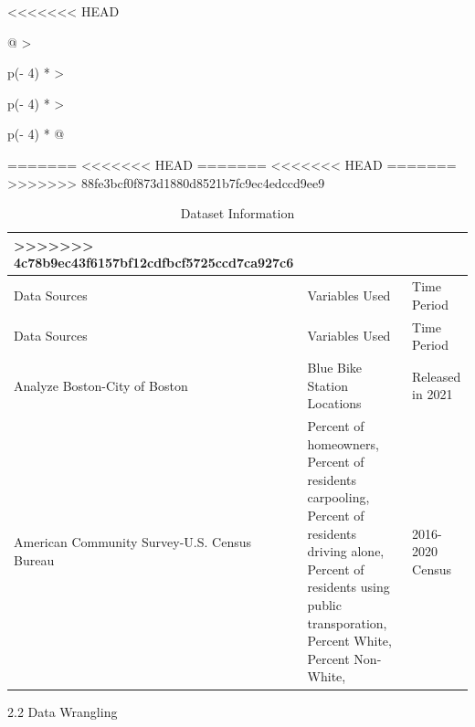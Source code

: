 \documentclass[
  12pt,
]{article}
\begin{document}
<<<<<<< HEAD
\begin{longtable}[]{@{}
  >{\raggedright\arraybackslash}p{(\columnwidth - 4\tabcolsep) * }
  >{\raggedright\arraybackslash}p{(\columnwidth - 4\tabcolsep) * }
  >{\raggedright\arraybackslash}p{(\columnwidth - 4\tabcolsep) * }@{}}
=======
<<<<<<< HEAD
=======
<<<<<<< HEAD
=======
>>>>>>> 88fe3bcf0f873d1880d8521b7fc9ec4edccd9ee9
\begin{longtable}[]{@{}lll@{}}
>>>>>>> 4c78b9ec43f6157bf12cdfbcf5725ccd7ca927c6
\caption{Dataset Information}\tabularnewline
\toprule
\begin{minipage}[b]{\linewidth}\raggedright
Data Sources
\end{minipage} & \begin{minipage}[b]{\linewidth}\raggedright
Variables Used
\end{minipage} & \begin{minipage}[b]{\linewidth}\raggedright
Time Period
\end{minipage} \\
\midrule
\endfirsthead
\toprule
\begin{minipage}[b]{\linewidth}\raggedright
Data Sources
\end{minipage} & \begin{minipage}[b]{\linewidth}\raggedright
Variables Used
\end{minipage} & \begin{minipage}[b]{\linewidth}\raggedright
Time Period
\end{minipage} \\
\midrule
\endhead
Analyze Boston-City of Boston & Blue Bike Station Locations & Released
in 2021 \\
American Community Survey-U.S. Census Bureau & Percent of homeowners,
Percent of residents carpooling, Percent of residents driving alone,
Percent of residents using public transporation, Percent White, Percent
Non-White, & 2016-2020 Census \\
\bottomrule
\end{longtable}

2.2 Data Wrangling


\end{longtable}
\end{document}

